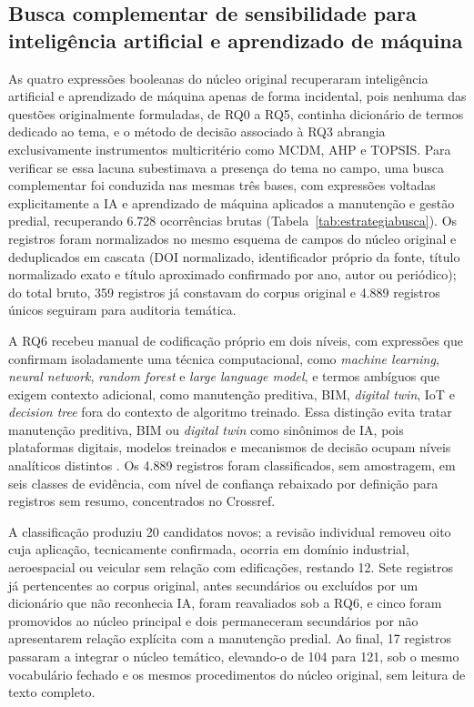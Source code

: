 \subsection{Busca complementar de sensibilidade para inteligência artificial e aprendizado de máquina}
\label{sec:buscaia}

As quatro expressões booleanas do núcleo original recuperaram inteligência artificial e aprendizado de máquina apenas de forma incidental, pois nenhuma das questões originalmente formuladas, de RQ0 a RQ5, continha dicionário de termos dedicado ao tema, e o método de decisão associado à RQ3 abrangia exclusivamente instrumentos multicritério como MCDM, AHP e TOPSIS. Para verificar se essa lacuna subestimava a presença do tema no campo, uma busca complementar foi conduzida nas mesmas três bases, com expressões voltadas explicitamente a IA e aprendizado de máquina aplicados a manutenção e gestão predial, recuperando 6.728 ocorrências brutas (Tabela~\ref{tab:estrategiabusca}). Os registros foram normalizados no mesmo esquema de campos do núcleo original e deduplicados em cascata (DOI normalizado, identificador próprio da fonte, título normalizado exato e título aproximado confirmado por ano, autor ou periódico); do total bruto, 359 registros já constavam do corpus original e 4.889 registros únicos seguiram para auditoria temática.

A RQ6 recebeu manual de codificação próprio em dois níveis, com expressões que confirmam isoladamente uma técnica computacional, como \textit{machine learning}, \textit{neural network}, \textit{random forest} e \textit{large language model}, e termos ambíguos que exigem contexto adicional, como manutenção preditiva, BIM, \textit{digital twin}, IoT e \textit{decision tree} fora do contexto de algoritmo treinado. Essa distinção evita tratar manutenção preditiva, BIM ou \textit{digital twin} como sinônimos de IA, pois plataformas digitais, modelos treinados e mecanismos de decisão ocupam níveis analíticos distintos \parencite{deng_bimdigitaltwins_2021,das_iotai_2025}. Os 4.889 registros foram classificados, sem amostragem, em seis classes de evidência, com nível de confiança rebaixado por definição para registros sem resumo, concentrados no Crossref.

A classificação produziu 20 candidatos novos; a revisão individual removeu oito cuja aplicação, tecnicamente confirmada, ocorria em domínio industrial, aeroespacial ou veicular sem relação com edificações, restando 12. Sete registros já pertencentes ao corpus original, antes secundários ou excluídos por um dicionário que não reconhecia IA, foram reavaliados sob a RQ6, e cinco foram promovidos ao núcleo principal e dois permaneceram secundários por não apresentarem relação explícita com a manutenção predial. Ao final, 17 registros passaram a integrar o núcleo temático, elevando-o de 104 para 121, sob o mesmo vocabulário fechado e os mesmos procedimentos do núcleo original, sem leitura de texto completo.

